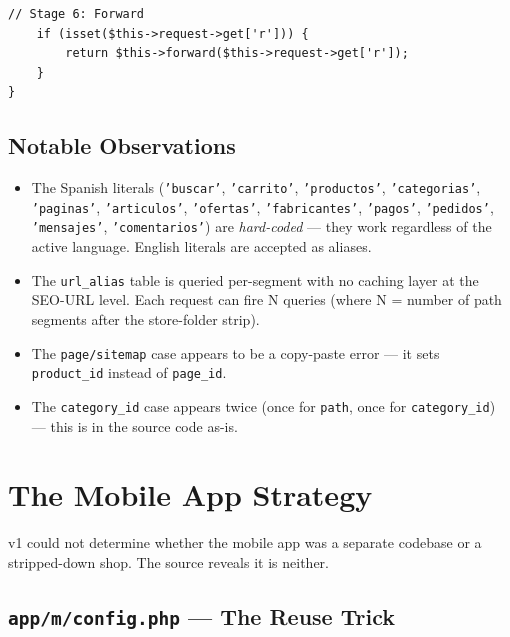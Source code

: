 \documentclass[11pt,a4paper]{article}
\begin{document}
\begin{lstlisting}[caption={\texttt{app/shop/controller/common/seo\_url.php} --- the 6-stage algorithm (abridged).},label={lst:seo-url}]
    // Stage 6: Forward
    if (isset($this->request->get['r'])) {
        return $this->forward($this->request->get['r']);
    }
}
\end{lstlisting}

\subsection{Notable Observations}

\begin{itemize}[leftmargin=1.6em,itemsep=2pt]
  \item The Spanish literals (\texttt{'buscar'}, \texttt{'carrito'},
        \texttt{'productos'}, \texttt{'categorias'},
        \texttt{'paginas'}, \texttt{'articulos'}, \texttt{'ofertas'},
        \texttt{'fabricantes'}, \texttt{'pagos'}, \texttt{'pedidos'},
        \texttt{'mensajes'}, \texttt{'comentarios'}) are
        \emph{hard-coded} --- they work regardless of the active
        language. English literals are accepted as aliases.
  \item The \texttt{url\_alias} table is queried per-segment with no
        caching layer at the SEO-URL level. Each request can fire
        N queries (where N = number of path segments after the
        store-folder strip).
  \item The \texttt{page/sitemap} case appears to be a copy-paste
        error --- it sets \texttt{product\_id} instead of
        \texttt{page\_id}.
  \item The \texttt{category\_id} case appears twice (once for
        \texttt{path}, once for \texttt{category\_id}) --- this is
        in the source code as-is.
\end{itemize}

\section{The Mobile App Strategy}\label{sec:mobile}

v1 could not determine whether the mobile app was a separate
codebase or a stripped-down shop. The source reveals it is neither.

\subsection{\texttt{app/m/config.php} --- The Reuse Trick}
\end{document}
